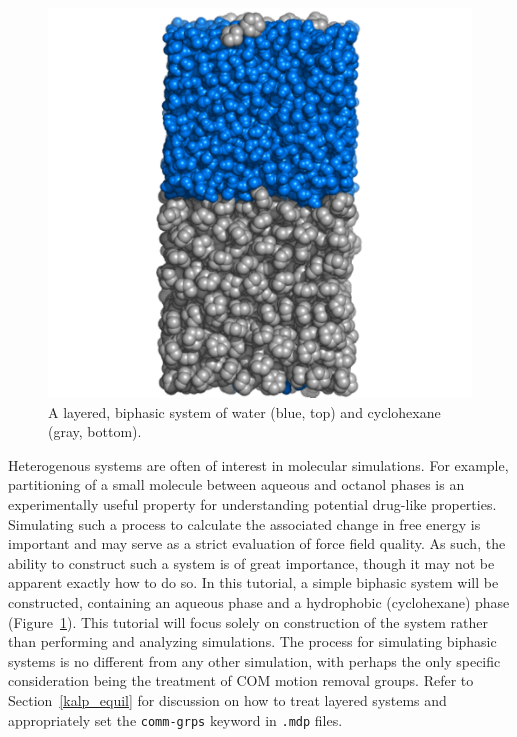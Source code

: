 \documentclass[9pt,tutorial,pubversion]{livecoms}
\begin{document}
\begin{figure}[h]
\centering
\includegraphics{biphasic_system}
\caption{A layered, biphasic system of water (blue, top) and cyclohexane (gray, bottom).}
\label{biphasic_system_fig}
\end{figure}

Heterogenous systems are often of interest in molecular simulations. For example, partitioning of a small molecule between aqueous and octanol phases is an experimentally useful property for understanding potential drug-like properties. Simulating such a process to calculate the associated change in free energy is important and may serve as a strict evaluation of force field quality. As such, the ability to construct such a system is of great importance, though it may not be apparent exactly how to do so. In this tutorial, a simple biphasic system will be constructed, containing an aqueous phase and a hydrophobic (cyclohexane) phase (Figure~\ref{biphasic_system_fig}). This tutorial will focus solely on construction of the system rather than performing and analyzing simulations. The process for simulating biphasic systems is no different from any other simulation, with perhaps the only specific consideration being the treatment of COM motion removal groups. Refer to Section~\ref{kalp_equil} for discussion on how to treat layered systems and appropriately set the \texttt{comm-grps} keyword in \texttt{.mdp} files.
\end{document}
